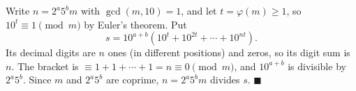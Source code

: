 Write $n=2^a5^bm$ with $\gcd(m,10)=1$, and let $t=\varphi(m)\ge1$, so $10^t\equiv1\pmod m$ by Euler's theorem. Put
\[s=10^{a+b}\left(10^{t}+10^{2t}+\cdots+10^{nt}\right).\]
Its decimal digits are $n$ ones (in different positions) and zeros, so its digit sum is $n$. The bracket is $\equiv1+1+\cdots+1=n\equiv0\pmod m$, and $10^{a+b}$ is divisible by $2^a5^b$. Since $m$ and $2^a5^b$ are coprime, $n=2^a5^bm$ divides $s$. $\blacksquare$
